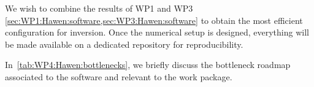 We wish to combine the results of WP1 and WP3 
\cref{sec:WP1:Hawen:software,sec:WP3:Hawen:software} 
to obtain the most efficient configuration for inversion.
Once the numerical setup is designed, everything will be 
made available on a dedicated repository for reproducibility.



In~\cref{tab:WP4:Hawen:bottlenecks}, we briefly discuss the bottleneck roadmap associated to the software and relevant to the work package.

